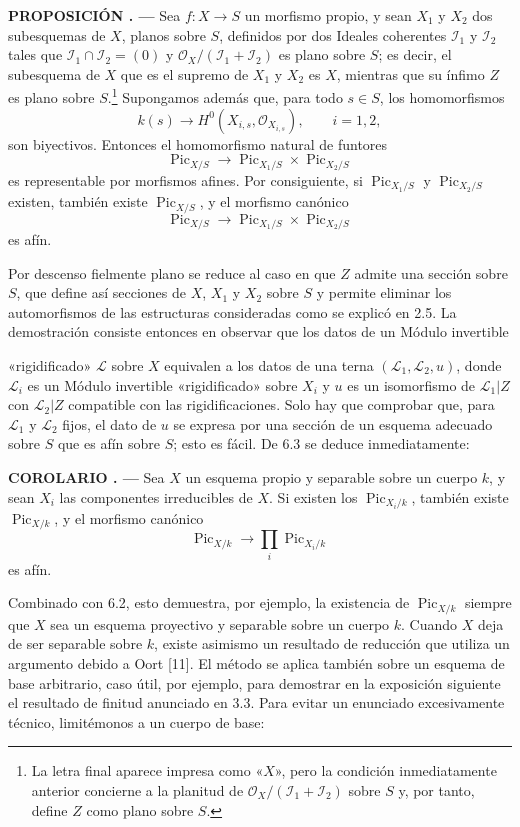 \documentclass[11pt,twoside,openany]{book}
\numberwithin{equation}{section}
\newcommand{\src}[1]{%
  \phantomsection\hypertarget{src:#1}{}%
  \marginpar{\raggedleft\footnotesize\sffamily #1}%
}
\theoremstyle{plain}
\theoremstyle{definition}
\theoremstyle{remark}
\newcommand{\result}[2]{%
  \par\medskip\noindent\textbf{#1%
  \if\relax\detokenize{#2}\relax\else\space#2\fi. ---}\enspace
}
\newcommand{\FgaUnitKey}{frontmatter}
\renewcommand{\src}[1]{%
  \phantomsection\hypertarget{src:\FgaUnitKey:#1}{}%
  \marginpar{\raggedleft\footnotesize\sffamily #1}%
}
\theoremstyle{plain}
\theoremstyle{definition}
\theoremstyle{remark}
\begin{document}
\result{PROPOSICIÓN}{6.3} Sea $f:X\longrightarrow S$ un morfismo propio, y sean
$X_1$ y $X_2$ dos subesquemas de $X$, planos sobre $S$, definidos por dos
Ideales coherentes $\mathcal I_1$ y $\mathcal I_2$ tales que
$\mathcal I_1\cap\mathcal I_2=(0)$ y
$\mathcal O_X/(\mathcal I_1+\mathcal I_2)$ es plano sobre $S$; es decir, el
subesquema de $X$ que es el supremo de $X_1$ y $X_2$ es $X$, mientras que su
ínfimo $Z$ es plano sobre $S$.\footnote{La letra final aparece impresa como
«$X$», pero la condición inmediatamente anterior concierne a la planitud de
$\mathcal O_X/(\mathcal I_1+\mathcal I_2)$ sobre $S$ y, por tanto, define $Z$
como plano sobre $S$.} Supongamos además que, para todo $s\in S$, los
homomorfismos
\[
k(s)\longrightarrow H^0(X_{i,s},\mathcal O_{X_{i,s}}),\qquad i=1,2,
\]
son biyectivos. Entonces el homomorfismo natural de funtores
\[
\operatorname{Pic}_{X/S}\longrightarrow
\operatorname{Pic}_{X_1/S}\times\operatorname{Pic}_{X_2/S}
\]
es representable por morfismos afines. Por consiguiente, si
$\operatorname{Pic}_{X_1/S}$ y $\operatorname{Pic}_{X_2/S}$ existen, también
existe $\operatorname{Pic}_{X/S}$, y el morfismo canónico
\[
\operatorname{Pic}_{X/S}\longrightarrow
\operatorname{Pic}_{X_1/S}\times\operatorname{Pic}_{X_2/S}
\]
es afín.

Por descenso fielmente plano se reduce al caso en que $Z$ admite una sección
sobre $S$, que define así secciones de $X$, $X_1$ y $X_2$ sobre $S$ y permite
eliminar los automorfismos de las estructuras consideradas como se explicó en
2.5. La demostración consiste entonces en observar que los datos de un Módulo
invertible

\src{159}
«rigidificado» $\mathcal L$ sobre $X$ equivalen a los datos de una terna
$(\mathcal L_1,\mathcal L_2,u)$, donde $\mathcal L_i$ es un Módulo invertible
«rigidificado» sobre $X_i$ y $u$ es un isomorfismo de $\mathcal L_1|Z$ con
$\mathcal L_2|Z$ compatible con las rigidificaciones. Solo hay que comprobar
que, para $\mathcal L_1$ y $\mathcal L_2$ fijos, el dato de $u$ se expresa por
una sección de un esquema adecuado sobre $S$ que es afín sobre $S$; esto es
fácil. De 6.3 se deduce inmediatamente:

\result{COROLARIO}{6.4} Sea $X$ un esquema propio y separable sobre un cuerpo
$k$, y sean $X_i$ las componentes irreducibles de $X$. Si existen los
$\operatorname{Pic}_{X_i/k}$, también existe $\operatorname{Pic}_{X/k}$, y el
morfismo canónico
\[
\operatorname{Pic}_{X/k}\longrightarrow\prod_i\operatorname{Pic}_{X_i/k}
\]
es afín.

Combinado con 6.2, esto demuestra, por ejemplo, la existencia de
$\operatorname{Pic}_{X/k}$ siempre que $X$ sea un esquema proyectivo y
separable sobre un cuerpo $k$. Cuando $X$ deja de ser separable sobre $k$,
existe asimismo un resultado de reducción que utiliza un argumento debido a
Oort [11]. El método se aplica también sobre un esquema de base arbitrario, caso
útil, por ejemplo, para demostrar en la exposición siguiente el resultado de
finitud anunciado en 3.3. Para evitar un enunciado excesivamente técnico,
limitémonos a un cuerpo de base:
\end{document}
